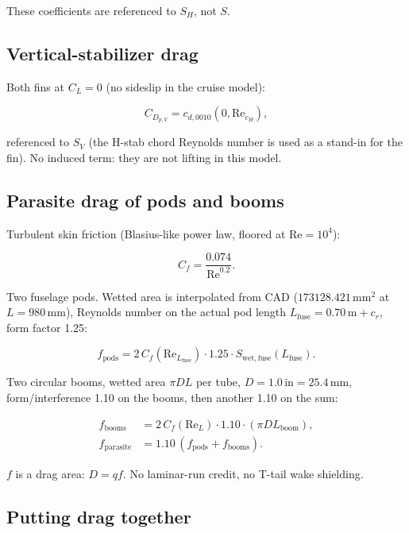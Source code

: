 \documentclass[11pt,letterpaper]{article}
\begin{document}
These coefficients are referenced to $S_H$, not $S$.

\subsection{Vertical-stabilizer drag}

Both fins at $C_L = 0$ (no sideslip in the cruise model):

\begin{equation}
  C_{D_{p,V}} = c_{d,0010}(0, \mathrm{Re}_{c_H}),
\end{equation}

referenced to $S_V$ (the H-stab chord Reynolds number is used as a stand-in for the fin). No induced term: they are not lifting in this model.

\subsection{Parasite drag of pods and booms}

Turbulent skin friction (Blasius-like power law, floored at $\mathrm{Re}=10^4$):

\begin{equation}
  C_f = \frac{0.074}{\mathrm{Re}^{0.2}}.
\end{equation}

Two fuselage pods. Wetted area is interpolated from CAD ($173128.421\,\mathrm{mm}^2$ at $L=980\,\mathrm{mm}$), Reynolds number on the actual pod length $L_\mathrm{fuse} = 0.70\,\mathrm{m}+c_r$, form factor 1.25:

\begin{equation}
  f_\mathrm{pods} = 2\, C_f(\mathrm{Re}_{L_\mathrm{fuse}}) \cdot 1.25 \cdot S_{\mathrm{wet,fuse}}(L_\mathrm{fuse}).
\end{equation}

Two circular booms, wetted area $\pi D L$ per tube, $D = 1.0\,\mathrm{in} = 25.4\,\mathrm{mm}$, form/interference 1.10 on the booms, then another 1.10 on the sum:

\begin{align}
  f_\mathrm{booms} &= 2\, C_f(\mathrm{Re}_L) \cdot 1.10 \cdot (\pi D L_\mathrm{boom}), \\
  f_\mathrm{parasite} &= 1.10\,(f_\mathrm{pods} + f_\mathrm{booms}).
\end{align}

$f$ is a drag area: $D = q f$. No laminar-run credit, no T-tail wake shielding.

\subsection{Putting drag together}
\end{document}
